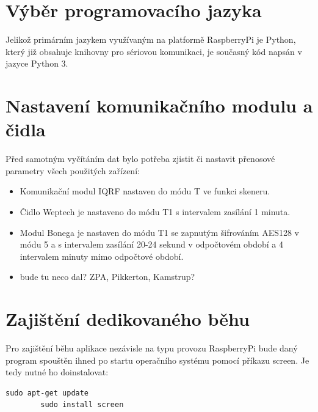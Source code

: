 \section{Výběr programovacího jazyka}
Jelikož primárním jazykem využívaným na platformě RaspberryPi je Python, který již obsahuje knihovny pro sériovou komunikaci, je současný kód napsán v jazyce Python 3.


\section{Nastavení komunikačního modulu a čidla}

Před samotným vyčítáním dat bylo potřeba zjistit či nastavit přenosové parametry všech použitých zařízení:

\begin{itemize}
	\item Komunikační modul IQRF nastaven do módu T ve funkci skeneru.
	\item Čidlo Weptech je nastaveno do módu T1 s intervalem zasílání 1 minuta. 
	\item Modul Bonega je nastaven do módu T1 se zapnutým šifrováním AES128 v módu 5 a s intervalem zasílání 20-24 sekund v odpočtovém období a 4 intervalem minuty mimo odpočtové období.
	\item \colorbox[rgb]{0,1,0}{bude tu neco dal? ZPA, Pikkerton, Kamstrup?}
\end{itemize}


\section{Zajištění dedikovaného běhu}
Pro zajištění běhu aplikace nezávisle na typu provozu RaspberryPi bude daný program spouštěn ihned po startu operačního systému pomocí příkazu screen. Je tedy nutné ho doinstalovat:
 
\begin{lstlisting}[style=MyCodeBash]
		sudo apt-get update
		sudo install screen		
	\end{lstlisting}



